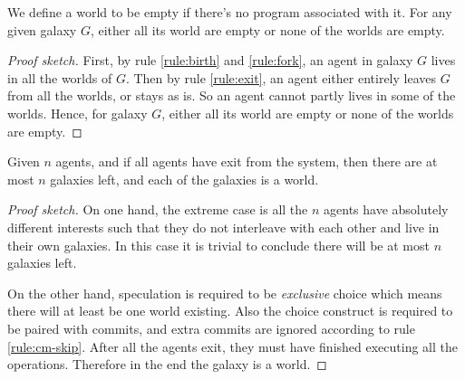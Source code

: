 \begin{proposition}
\label{prop-exit}
We define a world to be empty if there's no program associated with it.
For any given galaxy $G$, either all its world are empty or none of the worlds are
empty.
\end{proposition}
\begin{proof}[Proof sketch]
First, by rule \ref{rule:birth} and \ref{rule:fork}, an agent in galaxy $G$ lives 
in all the worlds of $G$. 
Then by rule \ref{rule:exit}, an agent either entirely leaves $G$ from all the worlds, 
or stays as is. 
So an agent cannot partly lives in some of the worlds. 
Hence, for galaxy $G$, either all its world are empty or none of the worlds are
empty.
\end{proof}
% 
% 
% 
% 
% 

\begin{theorem}
Given $n$ agents, and if all agents have exit from the system, 
then there are at most $n$ galaxies left, and each of the galaxies is a world. 
\end{theorem}
\begin{proof}[Proof sketch]
On one hand, the extreme case is all the $n$ agents have absolutely different interests such that 
they do not interleave with each other and live in their own galaxies. In this case 
it is trivial to conclude there will be at most $n$ galaxies left. 

On the other hand, speculation is required to be \emph{exclusive} choice which means 
there will at least be one world existing.
Also the choice construct is required to be paired with commits, and 
extra commits are ignored according to rule \ref{rule:cm-skip}. 
After all the agents exit, they must have finished executing all the operations.
Therefore in the end the galaxy is a world. 
\end{proof}



